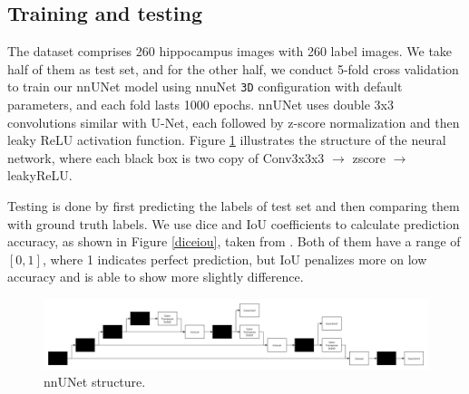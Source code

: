 \documentclass{article}
\begin{document}
\subsection{Training and testing}

The dataset comprises 260 hippocampus images with 260 label images. We take half of them as test set, and for the other half, we conduct 5-fold cross validation to train our nnUNet model using nnuNet \texttt{3D} configuration with default parameters, and each fold lasts 1000 epochs. nnUNet uses double 3x3 convolutions similar with U-Net, each followed by z-score normalization and then leaky ReLU activation function. Figure \ref{nnunetwork} illustrates the structure of the neural network, where each black box is two copy of Conv3x3x3 \(\rightarrow\) zscore \(\rightarrow\) leakyReLU.

Testing is done by first predicting the labels of test set and then comparing them with ground truth labels. We use dice and IoU coefficients to calculate prediction accuracy, as shown in Figure \ref{diceiou}, taken from \citet{huynh2023understanding}. Both of them have a range of \([0,1]\), where 1 indicates perfect prediction, but IoU penalizes more on low accuracy and is able to show more slightly difference.

\begin{figure}
  \centering
  \includegraphics[scale=0.19]{./figs/nnunetwork.png}
  \caption{nnUNet structure.}
  \label{nnunetwork}
\end{figure}
\end{document}
